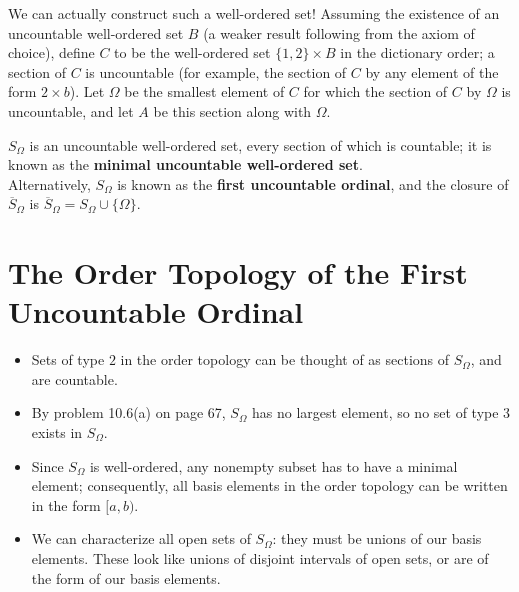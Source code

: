 \documentclass[11pt]{article}
\begin{document}
We can actually construct such a well-ordered set! Assuming the existence of an uncountable well-ordered set $B$ (a weaker result following from the axiom of choice), define $C$ to be the well-ordered set $\{1, 2\} \times B$ in the dictionary order; a section of $C$ is uncountable (for example, the section of $C$ by any element of the form $2 \times b$). Let $\Omega$ be the smallest element of $C$ for which the section of $C$ by $\Omega$ is uncountable, and let $A$ be this section along with $\Omega$.

\begin{definition*}
$S_\Omega$ is an uncountable well-ordered set, every section of which is countable; it is known as the \textbf{minimal uncountable well-ordered set}. \\

Alternatively, $S_\Omega$ is known as the \textbf{first uncountable ordinal}, and the closure of $\overline{S}_\Omega$ is $\overline{S}_\Omega = S_\Omega \cup \{ \Omega\}$.
\end{definition*}

\section{The Order Topology of the First Uncountable Ordinal}

\begin{itemize}
    \item Sets of type $2$ in the order topology can be thought of as sections of $S_{\Omega}$, and are countable.
    \item By problem 10.6(a) on page 67, $S_{\Omega}$ has no largest element, so no set of type $3$ exists in $S_{\Omega}$.
    \item Since $S_\Omega$ is well-ordered, any nonempty subset has to have a minimal element; consequently, all basis elements in the order topology can be written in the form $[a,b)$.  
    \item We can characterize all open sets of $S_\Omega$: they must be unions of our basis elements. These look like unions of disjoint intervals of open sets, or are of the form of our basis elements.
\end{itemize}
\end{document}
